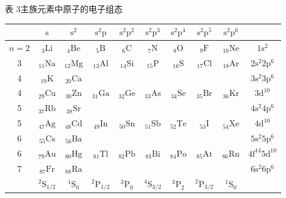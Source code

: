 \begin{center}
{\heiti 表 3}\quad 主族元素中原子的电子组态\\[0.8em]
\small\setlength{\tabcolsep}{3.2pt}%
\begin{tabular}{|c||c|c|c|c|c|c|c|c||c|}
\hline
 & $\mathrm{s}$ & $\mathrm{s}^{2}$ & $\mathrm{s}^{2}\mathrm{p}$ & $\mathrm{s}^{2}\mathrm{p}^{2}$ & $\mathrm{s}^{2}\mathrm{p}^{3}$ & $\mathrm{s}^{2}\mathrm{p}^{4}$ & $\mathrm{s}^{2}\mathrm{p}^{5}$ & $\mathrm{s}^{2}\mathrm{p}^{6}$ & \\
\hline
$n=2$ & ${}_{3}\mathrm{Li}$ & ${}_{4}\mathrm{Be}$ & ${}_{5}\mathrm{B}$ & ${}_{6}\mathrm{C}$ & ${}_{7}\mathrm{N}$ & ${}_{8}\mathrm{O}$ & ${}_{9}\mathrm{F}$ & ${}_{10}\mathrm{Ne}$ & $1\mathrm{s}^{2}$\\
3 & ${}_{11}\mathrm{Na}$ & ${}_{12}\mathrm{Mg}$ & ${}_{13}\mathrm{Al}$ & ${}_{14}\mathrm{Si}$ & ${}_{15}\mathrm{P}$ & ${}_{16}\mathrm{S}$ & ${}_{17}\mathrm{Cl}$ & ${}_{18}\mathrm{Ar}$ & $2\mathrm{s}^{2}2\mathrm{p}^{6}$\\
4 & ${}_{19}\mathrm{K}$ & ${}_{20}\mathrm{Ca}$ & & & & & & & $3\mathrm{s}^{2}3\mathrm{p}^{6}$\\
4 & ${}_{29}\mathrm{Cu}$ & ${}_{30}\mathrm{Zn}$ & ${}_{31}\mathrm{Ga}$ & ${}_{32}\mathrm{Ge}$ & ${}_{33}\mathrm{As}$ & ${}_{34}\mathrm{Se}$ & ${}_{35}\mathrm{Br}$ & ${}_{36}\mathrm{Kr}$ & $3\mathrm{d}^{10}$\\
5 & ${}_{37}\mathrm{Rb}$ & ${}_{38}\mathrm{Sr}$ & & & & & & & $4\mathrm{s}^{2}4\mathrm{p}^{6}$\\
5 & ${}_{47}\mathrm{Ag}$ & ${}_{48}\mathrm{Cd}$ & ${}_{49}\mathrm{In}$ & ${}_{50}\mathrm{Sn}$ & ${}_{51}\mathrm{Sb}$ & ${}_{52}\mathrm{Te}$ & ${}_{53}\mathrm{I}$ & ${}_{54}\mathrm{Xe}$ & $4\mathrm{d}^{10}$\\
6 & ${}_{55}\mathrm{Cs}$ & ${}_{56}\mathrm{Ba}$ & & & & & & & $5\mathrm{s}^{2}5\mathrm{p}^{6}$\\
6 & ${}_{79}\mathrm{Au}$ & ${}_{80}\mathrm{Hg}$ & ${}_{81}\mathrm{Tl}$ & ${}_{82}\mathrm{Pb}$ & ${}_{83}\mathrm{Bi}$ & ${}_{84}\mathrm{Po}$ & ${}_{85}\mathrm{At}$ & ${}_{86}\mathrm{Rn}$ & $4\mathrm{f}^{14}5\mathrm{d}^{10}$\\
7 & ${}_{87}\mathrm{Fr}$ & ${}_{88}\mathrm{Ra}$ & & & & & & & $6\mathrm{s}^{2}6\mathrm{p}^{6}$\\
\hline
 & ${}^{2}\mathrm{S}_{1/2}$ & ${}^{1}\mathrm{S}_{0}$ & ${}^{2}\mathrm{P}_{1/2}$ & ${}^{3}\mathrm{P}_{0}$ & ${}^{4}\mathrm{S}_{3/2}$ & ${}^{3}\mathrm{P}_{2}$ & ${}^{2}\mathrm{P}_{3/2}$ & ${}^{1}\mathrm{S}_{0}$ & \\
\hline
\end{tabular}
\end{center}

